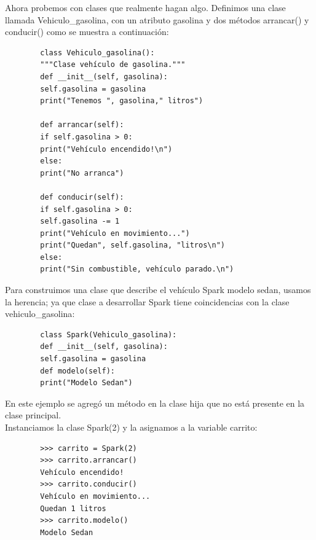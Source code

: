 {{	Ahora probemos con clases que realmente hagan algo. Definimos una clase llamada {\ttfamily Vehiculo\_gasolina}, con un atributo {\ttfamily gasolina} y dos métodos {\ttfamily arrancar()} y {\ttfamily conducir()} como se muestra a continuación:
	
	\hspace{-2.6cm}{\ttfamily \scriptsize vehiculo}
	
	\vspace{-0.2cm}
	\hspace{-2.8cm}{\ttfamily \scriptsize \_gasolina.py}\vspace{-0.84cm}
	\begin{lstlisting}
		class Vehiculo_gasolina():
		"""Clase vehículo de gasolina."""
		def __init__(self, gasolina):
		self.gasolina = gasolina
		print("Tenemos ", gasolina," litros")
		
		def arrancar(self):
		if self.gasolina > 0:
		print("Vehículo encendido!\n")
		else:
		print("No arranca")
		
		def conducir(self):
		if self.gasolina > 0:
		self.gasolina -= 1
		print("Vehículo en movimiento...")
		print("Quedan", self.gasolina, "litros\n")
		else:
		print("Sin combustible, vehículo parado.\n")
	\end{lstlisting}
	
	
	Para construimos una clase que describe el vehículo Spark modelo sedan, usamos la herencia; ya que clase a desarrollar  {\ttfamily Spark} tiene coincidencias  con la clase {\ttfamily vehiculo\_gasolina}:
	
	\hspace{-2.2cm}{\ttfamily \scriptsize Spark.py}  \vspace{-0.5cm}
	\begin{lstlisting}
		class Spark(Vehiculo_gasolina):
		def __init__(self, gasolina):
		self.gasolina = gasolina
		def modelo(self):
		print("Modelo Sedan")
	\end{lstlisting}
	
	En este ejemplo se agregó un método en la clase hija que no está  presente en la clase principal.\\ 
	
	
	Instanciamos la clase Spark(2) y la asignamos a la variable carrito: 
	
	\begin{lstlisting}
		>>> carrito = Spark(2)
		>>> carrito.arrancar()
		Vehículo encendido!
		>>> carrito.conducir()
		Vehículo en movimiento...
		Quedan 1 litros
		>>> carrito.modelo()
		Modelo Sedan
	\end{lstlisting}
	
}}
